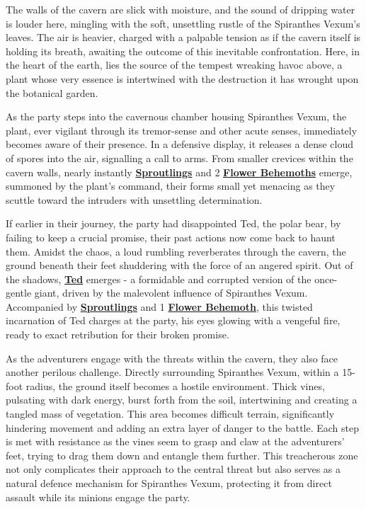 The walls of the cavern are slick with moisture, and the sound of dripping water is louder here, mingling with the soft, unsettling rustle of the Spiranthes Vexum's leaves. The air is heavier, charged with a palpable tension as if the cavern itself is holding its breath, awaiting the outcome of this inevitable confrontation. Here, in the heart of the earth, lies the source of the tempest wreaking havoc above, a plant whose very essence is intertwined with the destruction it has wrought upon the botanical garden.

As the party steps into the cavernous chamber housing Spiranthes Vexum, the plant, ever vigilant through its tremor-sense and other acute senses, immediately becomes aware of their presence. In a defensive display, it releases a dense cloud of spores into the air, signalling a call to arms. From smaller crevices within the cavern walls, nearly instantly  \hyperref[sec:Sproutlings]{\textbf{Sproutlings}} and 2 \hyperref[sec:Flower Behemoth]{\textbf{Flower Behemoths}} emerge, summoned by the plant's command, their forms small yet menacing as they scuttle toward the intruders with unsettling determination.

If earlier in their journey, the party had disappointed Ted, the polar bear, by failing to keep a crucial promise, their past actions now come back to haunt them. Amidst the chaos, a loud rumbling reverberates through the cavern, the ground beneath their feet shuddering with the force of an angered spirit. Out of the shadows, \hyperref[sec:VexiniteTed]{\textbf{Ted}} emerges - a formidable and corrupted version of the once-gentle giant, driven by the malevolent influence of Spiranthes Vexum. Accompanied by  \hyperref[sec:Sproutlings]{\textbf{Sproutlings}} and 1 \hyperref[sec:Flower Behemoth]{\textbf{Flower Behemoth}}, this twisted incarnation of Ted charges at the party, his eyes glowing with a vengeful fire, ready to exact retribution for their broken promise.

As the adventurers engage with the threats within the cavern, they also face another perilous challenge. Directly surrounding Spiranthes Vexum, within a 15-foot radius, the ground itself becomes a hostile environment. Thick vines, pulsating with dark energy, burst forth from the soil, intertwining and creating a tangled mass of vegetation. This area becomes difficult terrain, significantly hindering movement and adding an extra layer of danger to the battle. Each step is met with resistance as the vines seem to grasp and claw at the adventurers' feet, trying to drag them down and entangle them further. This treacherous zone not only complicates their approach to the central threat but also serves as a natural defence mechanism for Spiranthes Vexum, protecting it from direct assault while its minions engage the party.

